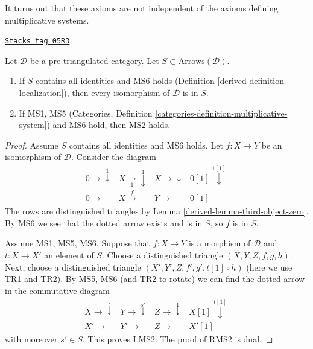 It turns out that these axioms are not independent of the
axioms defining multiplicative systems.

\begin{lemma}
\label{derived-lemma-localization-conditions}
\href{https://stacks.math.columbia.edu/tag/05R3}{\texttt{Stacks tag 05R3}}

Let $\mathcal{D}$ be a pre-triangulated category.
Let $S \subset \text{Arrows}(\mathcal{D})$.
\begin{enumerate}
\item If $S$ contains all identities and MS6 holds
(Definition \ref{derived-definition-localization}),
then every isomorphism of $\mathcal{D}$ is in $S$.
\item If MS1, MS5 (Categories, Definition
\ref{categories-definition-multiplicative-system}) and MS6 hold,
then MS2 holds.
\end{enumerate}
\end{lemma}

\begin{proof}

Assume $S$ contains all identities and MS6 holds.
Let $f : X \to Y$ be an isomorphism of $\mathcal{D}$.
Consider the diagram
$$
\begin{array}{cccc}0 \longrightarrow\overset{1}{\downarrow} & X \underset{1}{\longrightarrow}\overset{1}{\downarrow} & X \longrightarrow\downarrow & 0[1] \overset{1[1]}{\downarrow} \\ 0 \longrightarrow & X \overset{f}{\longrightarrow} & Y \longrightarrow & 0[1]\end{array}
$$
The rows are distinguished triangles by Lemma \ref{derived-lemma-third-object-zero}.
By MS6 we see that the dotted arrow exists and is in $S$, so $f$ is in $S$.

\medskip\noindent
Assume MS1, MS5, MS6.
Suppose that $f : X \to Y$ is a morphism of $\mathcal{D}$ and
$t : X \to X'$ an element of $S$. Choose a distinguished triangle
$(X, Y, Z, f, g, h)$. Next, choose a distinguished triangle
$(X', Y', Z, f', g', t[1] \circ h)$ (here we use TR1 and TR2).
By MS5, MS6 (and TR2 to rotate) we can find the dotted arrow
in the commutative diagram
$$
\begin{array}{cccc}X \longrightarrow\overset{t}{\downarrow} & Y \longrightarrow\overset{s'}{\downarrow} & Z \longrightarrow\overset{1}{\downarrow} & X[1] \overset{t[1]}{\downarrow} \\ X' \longrightarrow & Y' \longrightarrow & Z \longrightarrow & X'[1]\end{array}
$$
with moreover $s' \in S$. This proves LMS2. The proof of RMS2 is dual.
\end{proof}

